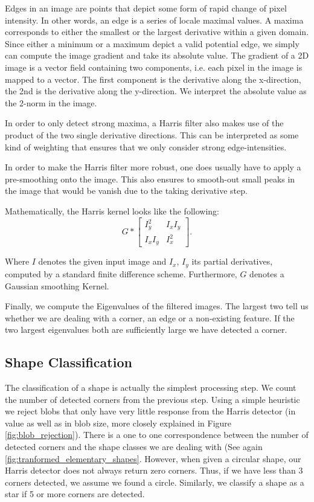 \documentclass[conference]{IEEEtran}
\begin{document}
Edges in an image are points that depict some form of rapid change of pixel intensity.
 In other words, an edge is a series of locale maximal values. 
 A maxima corresponds to either the smallest or the largest derivative within a given domain. 
 Since either a minimum or a maximum depict a valid potential edge, we simply can compute the image gradient and take its absolute value. 
 The gradient of a 2D image is a vector field containing two components, i.e. each pixel in the image is mapped to a vector. 
 The first component is the derivative along the x-direction, the 2nd is the derivative along the y-direction. 
 We interpret the absolute value as the 2-norm in the image. 

In order to only detect strong maxima, a Harris filter also makes use of the product of the two single derivative directions. 
This can be interpreted as some kind of weighting that ensures that we only consider strong edge-intensities. 

In order to make the Harris filter more robust, one does usually have to apply a pre-smoothing onto the image. This also ensures to smooth-out small peaks in the image that would be vanish due to the taking derivative step. 

Mathematically, the Harris kernel looks like the following: 
\begin{equation}
G * 
\begin{bmatrix}
 I_y^2  & I_x I_y \\
 I_x I_y & I_x^2
\end{bmatrix}
.
\end{equation}

Where $I$ denotes the given input image and $I_x$, $I_y$ its partial derivatives, computed by a standard finite difference scheme. Furthermore, $G$ denotes a Gaussian smoothing Kernel. 

Finally, we compute the Eigenvalues of the filtered images. The largest two tell us whether we are dealing with a corner, an edge or a non-existing feature. If the two largest eigenvalues both are sufficiently large we have detected a corner.

\subsection{Shape Classification}
The classification of a shape is actually the simplest processing step. 
We count the number of detected corners from the previous step. 
Using a simple heuristic we reject blobs that only have very little response from the Harris 
detector (in value as well as in blob size, more closely explained in Figure \ref{fig:blob_rejection}).
There is a one to one correspondence between the number of detected corners and the shape classes
we are dealing with (See again \ref{fig:tranformed_elementary_shapes}.
However, when given a circular shape, our Harris detector does not always return zero corners. 
Thus, if we have less than 3 corners detected, we assume we found a circle. 
Similarly, we classify a shape as a star if 5 or more corners are detected.
\end{document}
